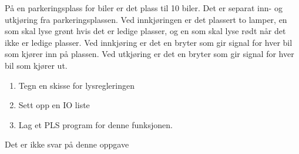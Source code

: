 


På en parkeringsplass for biler er det plass til 10 biler. Det er
separat inn- og utkjøring fra parkeringsplassen. Ved innkjøringen
er det plassert to lamper, en som skal lyse grønt hvis det er ledige
plasser, og en som skal lyse rødt når det ikke er ledige plasser.
Ved innkjøring er det en bryter som gir signal for hver bil som kjører
inn på plassen. Ved utkjøring er det en bryter som gir signal for
hver bil som kjører ut.
\begin{enumerate}
\item Tegn en skisse for lysregleringen
\item Sett opp en IO liste
\item Lag et PLS program for denne funksjonen.
\end{enumerate}

\vskip 10pt





Det er ikke svar på denne oppgave












